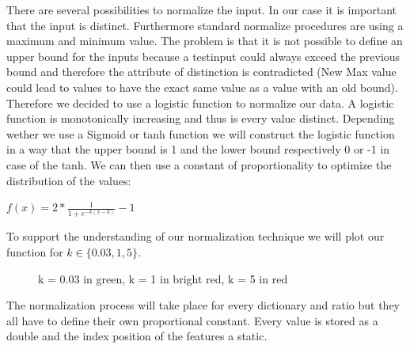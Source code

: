 \documentclass[paper=A4,pagesize=auto,12pt,headinclude=true,footinclude=true,BCOR=0mm,DIV=calc]{scrartcl}
\begin{document}
	There are several possibilities to normalize the input. In our case it is important that the input is distinct. Furthermore standard normalize procedures are using a maximum and minimum value. The problem is that it is not possible to define an upper bound for the inputs because a testinput could always exceed the previous bound and therefore the attribute of distinction is contradicted (New Max value could lead to values to have the exact same value as a value with an old bound).
	Therefore we decided to use a logistic function to normalize our data. A logistic function is monotonically increasing and thus is every value distinct. Depending wether we use a Sigmoid or tanh function we will construct the logistic function in a way that the upper bound is 1 and the lower bound respectively 0 or -1 in case of the tanh. 
	We can then use a constant of proportionality to optimize the distribution of the values:
	
	$f(x) = 2 * \frac{1}{1 + e^{-k(x-k)}} -1$
	
	To support the understanding of our normalization technique we will plot our function for $k \in \{0.03, 1, 5\}$.\\
	\begin{figure}[H]
		\caption{k = 0.03 in green, k = 1 in bright red, k = 5 in red}
	\end{figure}
	
	The normalization process will take place for every dictionary and ratio but they all have to define their own proportional constant.
	Every value is stored as a double and the index position of the features a static.
	
	
	
	
	
\end{document}
